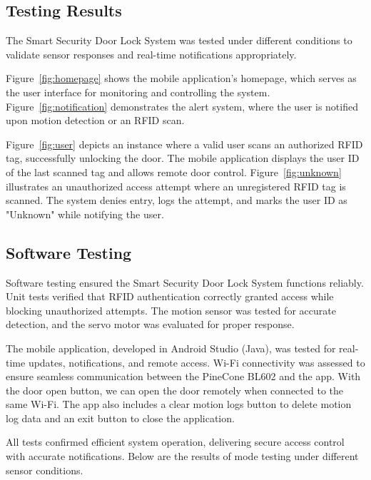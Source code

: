 \documentclass[a4paper]{scrartcl}
\begin{document}
\subsection{Testing Results}

The Smart Security Door Lock System was tested under different conditions to validate sensor responses and real-time notifications appropriately.

Figure~\ref{fig:homepage} shows the mobile application's homepage, which serves as the user interface for monitoring and controlling the system. Figure~\ref{fig:notification} demonstrates the alert system, where the user is notified upon motion detection or an RFID scan. 

Figure~\ref{fig:user} depicts an instance where a valid user scans an authorized RFID tag, successfully unlocking the door. The mobile application displays the user ID of the last scanned tag and allows remote door control. Figure~\ref{fig:unknown} illustrates an unauthorized access attempt where an unregistered RFID tag is scanned. The system denies entry, logs the attempt, and marks the user ID as "Unknown" while notifying the user.
\subsection{Software Testing}
\label{sec:testing}
Software testing ensured the Smart Security Door Lock System functions reliably. Unit tests verified that RFID authentication correctly granted access while blocking unauthorized attempts. The motion sensor was tested for accurate detection, and the servo motor was evaluated for proper response.

The mobile application, developed in Android Studio (Java), was tested for real-time updates, notifications, and remote access. Wi-Fi connectivity was assessed to ensure seamless communication between the PineCone BL602 and the app. With the door open button, we can open the door remotely when connected to the same Wi-Fi. The app also includes a clear motion logs button to delete motion log data and an exit button to close the application.

All tests confirmed efficient system operation, delivering secure access control with accurate notifications. Below are the results of mode testing under different sensor conditions.
\end{document}
